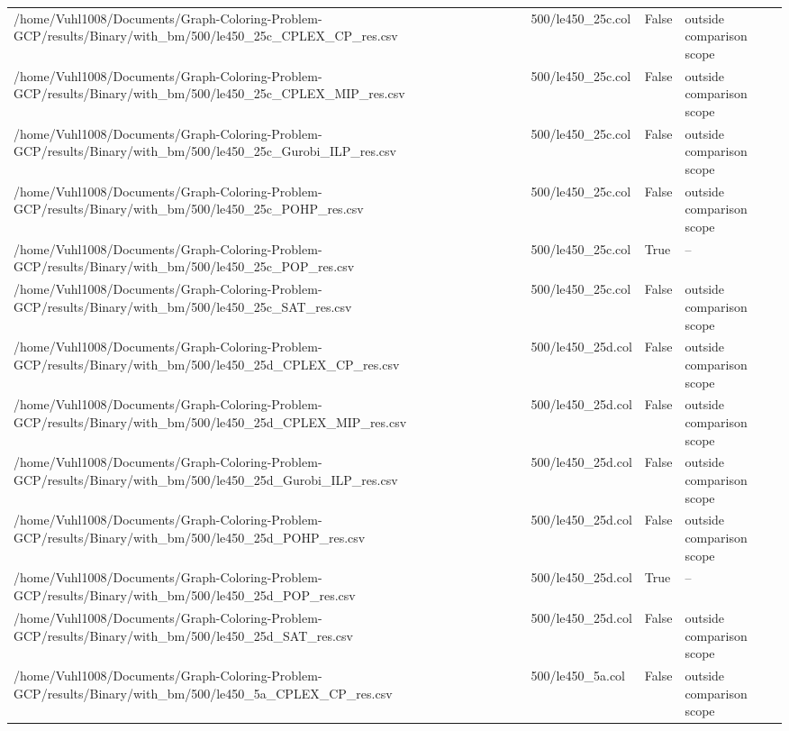 \begin{table}[htbp]
\begin{tabular}{llll}
/home/Vuhl1008/Documents/Graph-Coloring-Problem-GCP/results/Binary/with\_bm/500/le450\_25c\_CPLEX\_CP\_res.csv & 500/le450\_25c.col & False & outside comparison scope \\
/home/Vuhl1008/Documents/Graph-Coloring-Problem-GCP/results/Binary/with\_bm/500/le450\_25c\_CPLEX\_MIP\_res.csv & 500/le450\_25c.col & False & outside comparison scope \\
/home/Vuhl1008/Documents/Graph-Coloring-Problem-GCP/results/Binary/with\_bm/500/le450\_25c\_Gurobi\_ILP\_res.csv & 500/le450\_25c.col & False & outside comparison scope \\
/home/Vuhl1008/Documents/Graph-Coloring-Problem-GCP/results/Binary/with\_bm/500/le450\_25c\_POHP\_res.csv & 500/le450\_25c.col & False & outside comparison scope \\
/home/Vuhl1008/Documents/Graph-Coloring-Problem-GCP/results/Binary/with\_bm/500/le450\_25c\_POP\_res.csv & 500/le450\_25c.col & True & -- \\
/home/Vuhl1008/Documents/Graph-Coloring-Problem-GCP/results/Binary/with\_bm/500/le450\_25c\_SAT\_res.csv & 500/le450\_25c.col & False & outside comparison scope \\
/home/Vuhl1008/Documents/Graph-Coloring-Problem-GCP/results/Binary/with\_bm/500/le450\_25d\_CPLEX\_CP\_res.csv & 500/le450\_25d.col & False & outside comparison scope \\
/home/Vuhl1008/Documents/Graph-Coloring-Problem-GCP/results/Binary/with\_bm/500/le450\_25d\_CPLEX\_MIP\_res.csv & 500/le450\_25d.col & False & outside comparison scope \\
/home/Vuhl1008/Documents/Graph-Coloring-Problem-GCP/results/Binary/with\_bm/500/le450\_25d\_Gurobi\_ILP\_res.csv & 500/le450\_25d.col & False & outside comparison scope \\
/home/Vuhl1008/Documents/Graph-Coloring-Problem-GCP/results/Binary/with\_bm/500/le450\_25d\_POHP\_res.csv & 500/le450\_25d.col & False & outside comparison scope \\
/home/Vuhl1008/Documents/Graph-Coloring-Problem-GCP/results/Binary/with\_bm/500/le450\_25d\_POP\_res.csv & 500/le450\_25d.col & True & -- \\
/home/Vuhl1008/Documents/Graph-Coloring-Problem-GCP/results/Binary/with\_bm/500/le450\_25d\_SAT\_res.csv & 500/le450\_25d.col & False & outside comparison scope \\
/home/Vuhl1008/Documents/Graph-Coloring-Problem-GCP/results/Binary/with\_bm/500/le450\_5a\_CPLEX\_CP\_res.csv & 500/le450\_5a.col & False & outside comparison scope \\

\end{tabular}
\end{table}
